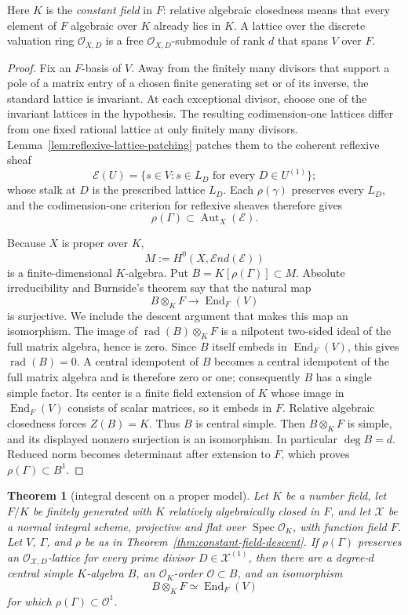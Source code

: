 \documentclass[11pt,reqno]{amsart}
\newtheorem{theorem}{Theorem}[section]
\theoremstyle{definition}
\theoremstyle{remark}
\newcommand{\cO}{\mathcal O}
\newcommand{\End}{\operatorname{End}}
\begin{document}
Here \(K\) is the \emph{constant field} in \(F\): relative algebraic
closedness means that every element of \(F\) algebraic over \(K\) already
lies in \(K\).  A lattice over the discrete valuation ring \(\cO_{X,D}\)
is a free \(\cO_{X,D}\)-submodule of rank \(d\) that spans \(V\) over \(F\).

\begin{proof}
Fix an \(F\)-basis of \(V\).  Away from the finitely many divisors that
support a pole of a matrix entry of a chosen finite generating set or of its
inverse, the standard lattice is invariant.  At each exceptional divisor,
choose one of the invariant lattices in the hypothesis.  The resulting
codimension-one lattices differ from one fixed rational lattice at only
finitely many divisors.  Lemma~\ref{lem:reflexive-lattice-patching} patches
them to the coherent reflexive sheaf
\[
 \mathcal E(U)=
 \{s\in V:s\in L_D\text{ for every }D\in U^{(1)}\};
\]
whose stalk at \(D\) is the prescribed lattice \(L_D\).  Each
\(\rho(\gamma)\) preserves every \(L_D\), and the codimension-one criterion
for reflexive sheaves therefore gives
\[
 \rho(\Gamma)\subset\operatorname{Aut}_X(\mathcal E).
\]

Because \(X\) is proper over \(K\),
\[
 M:=H^0\!\left(X,\mathcal End(\mathcal E)\right)
\]
is a finite-dimensional \(K\)-algebra.  Put
\(B=K[\rho(\Gamma)]\subset M\).  Absolute irreducibility and Burnside's
theorem say that the natural map
\[
 B\otimes_KF\longrightarrow\End_F(V)
\]
is surjective.  We include the descent argument that makes this map an
isomorphism.  The image of
\(\operatorname{rad}(B)\otimes_KF\) is a nilpotent two-sided ideal of the
full matrix algebra, hence is zero.  Since \(B\) itself embeds in
\(\End_F(V)\), this gives \(\operatorname{rad}(B)=0\).  A central idempotent
of \(B\) becomes a central idempotent of the full matrix algebra and is
therefore zero or one; consequently \(B\) has a single simple factor.  Its
center is a finite field extension of \(K\) whose image in
\(\End_F(V)\) consists of scalar matrices, so it embeds in \(F\).
Relative algebraic closedness forces \(Z(B)=K\).  Thus \(B\) is central
simple.  Then \(B\otimes_KF\) is simple, and its displayed nonzero
surjection is an isomorphism.  In particular \(\deg B=d\).  Reduced norm
becomes determinant after extension to \(F\), which proves
\(\rho(\Gamma)\subset B^1\).
\end{proof}

\begin{theorem}[integral descent on a proper model]
\label{thm:proper-model-descent}
Let \(K\) be a number field, let \(F/K\) be finitely generated with \(K\)
relatively algebraically closed in \(F\), and let \(\mathcal X\) be a
normal integral scheme, projective and flat over
\(\operatorname{Spec}\cO_K\), with function field \(F\).  Let \(V\),
\(\Gamma\), and \(\rho\) be as in
Theorem~\ref{thm:constant-field-descent}.  If \(\rho(\Gamma)\) preserves an
\(\cO_{\mathcal X,D}\)-lattice for every prime divisor
\(D\in\mathcal X^{(1)}\), then there are a degree-\(d\) central simple
\(K\)-algebra \(B\), an \(\cO_K\)-order \(\cO\subset B\), and an isomorphism
\[
 B\otimes_KF\simeq\End_F(V)
\]
for which \(\rho(\Gamma)\subset\cO^1\).
\end{theorem}
\end{document}
